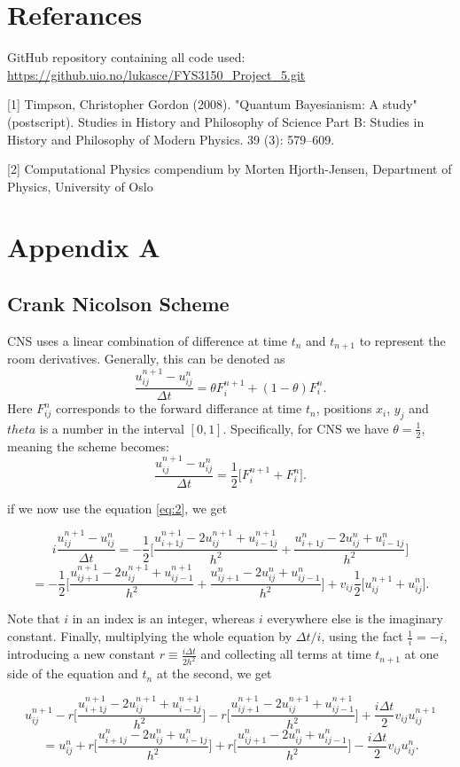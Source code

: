 \documentclass[english,notitlepage,reprint,nofootinbib]{revtex4-1}  %
\begin{document}
\onecolumngrid
% 




\section{Referances}

GitHub repository containing all code used:
\url{https://github.uio.no/lukasce/FYS3150_Project_5.git}

[1] Timpson, Christopher Gordon (2008). "Quantum Bayesianism: A study" (postscript). Studies in History and Philosophy of Science Part B: Studies in History and Philosophy of Modern Physics. 39 (3): 579–609.

[2] Computational Physics compendium by  Morten Hjorth-Jensen, Department of Physics, University of Oslo




\section{Appendix A}
\subsection{Crank Nicolson Scheme}
CNS uses a linear combination of difference at time $t_n$ and $t_{n+1}$ to represent the room derivatives. Generally, this can be denoted as
$$ \frac{u_{ij}^{n+1} - u_{ij}^n}{\Delta t} =  \theta F_i^{n+1} + (1 - \theta) F_i^{n}. $$
Here $F_{ij}^n$ corresponds to the forward differance at time $t_n$, positions $x_i$, $y_j$ and $theta$ is a number in the interval $[0,1]$. Specifically, for CNS we have $\theta = \frac{1}{2}$, meaning the scheme becomes:
$$ \frac{u_{ij}^{n+1} - u_{ij}^n}{\Delta t} = \frac{1}{2} \Big[ F_i^{n+1} + F_i^{n} \Big]. $$

if we now use the equation \ref{eq:2}, we get

$$ i \frac{u_{ij}^{n+1} - u_{ij}^{n}}{\Delta t} = - \frac{1}{2} \Big[ \frac{u_{i+1j}^{n+1} - 2u_{ij}^{n+1} + u_{i-1j}^{n+1}}{h^2} + \frac{u_{i+1j}^{n} - 2u_{ij}^{n} + u_{i-1j}^{n}}{h^2} \Big] $$
$$ = - \frac{1}{2} \Big[ \frac{u_{ij+1}^{n+1} - 2u_{ij}^{n+1} + u_{ij-1}^{n+1}}{h^2} + \frac{u_{ij+1}^{n} - 2u_{ij}^{n} + u_{ij-1}^{n}}{h^2} \Big] + v_{ij} \frac{1}{2} \Big[u^{n+1}_{ij} + u^{n}_{ij} \Big]. $$


Note that $i$ in an index is an integer, whereas $i$ everywhere else is the imaginary constant. Finally, multiplying the whole equation by $\Delta t/i$, using the fact $\frac{1}{i} = -i$, introducing a new constant $r \equiv \frac{i \Delta t}{2 h^2}$ and collecting all terms at time $t_{n+1}$ at one side of the equation and $t_{n}$ at the second, we get

$$ u_{ij}^{n+1} - r \Big[ \frac{u_{i+1j}^{n+1} - 2u_{ij}^{n+1} + u_{i-1j}^{n+1}}{h^2} \Big] - r \Big[ \frac{u_{ij+1}^{n+1} - 2u_{ij}^{n+1} + u_{ij-1}^{n+1}}{h^2} \Big] + \frac{i \Delta t}{2} v_{ij} u_{ij}^{n+1} $$
$$ = u_{ij}^{n} + r \Big[ \frac{u_{i+1j}^{n} - 2u_{ij}^{n} + u_{i-1j}^{n}}{h^2} \Big]
+ r \Big[ \frac{u_{ij+1}^{n} - 2u_{ij}^{n} + u_{ij-1}^{n}}{h^2} \Big] - \frac{i \Delta t}{2} v_{ij} u_{ij}^{n} . $$
\end{document}
